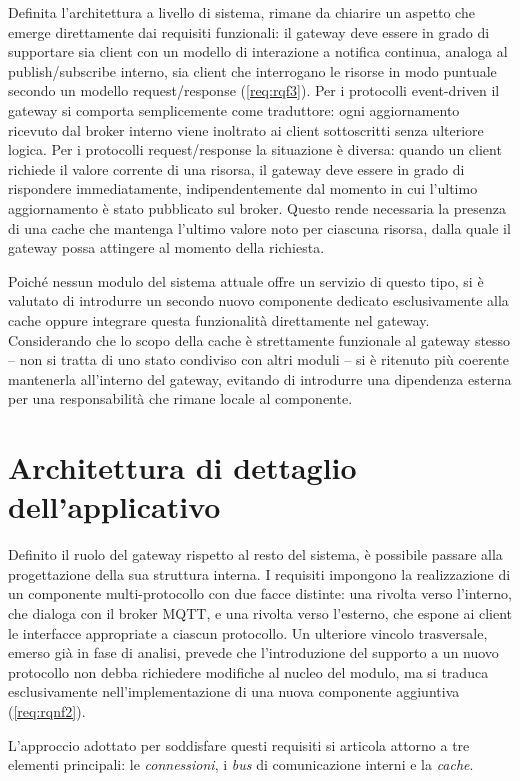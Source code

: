 Definita l'architettura a livello di sistema, rimane da chiarire un aspetto che emerge direttamente dai requisiti funzionali: il gateway deve essere in grado di supportare sia client con un modello di interazione a notifica continua, analoga al publish/subscribe interno, sia client che interrogano le risorse in modo puntuale secondo un modello request/response (\ref{req:rqf3}). Per i protocolli event-driven il gateway si comporta semplicemente come traduttore: ogni aggiornamento ricevuto dal broker interno viene inoltrato ai client sottoscritti senza ulteriore logica. Per i protocolli request/response la situazione è diversa: quando un client richiede il valore corrente di una risorsa, il gateway deve essere in grado di rispondere immediatamente, indipendentemente dal momento in cui l'ultimo aggiornamento è stato pubblicato sul broker. Questo rende necessaria la presenza di una cache che mantenga l'ultimo valore noto per ciascuna risorsa, dalla quale il gateway possa attingere al momento della richiesta.

Poiché nessun modulo del sistema attuale offre un servizio di questo tipo, si è valutato di  introdurre un secondo nuovo componente dedicato esclusivamente alla cache oppure integrare questa funzionalità direttamente nel gateway. Considerando che lo scopo della cache è strettamente funzionale al gateway stesso -- non si tratta di uno stato condiviso con altri moduli -- si è ritenuto più coerente mantenerla all'interno del gateway, evitando di introdurre una dipendenza esterna per una responsabilità che rimane locale al componente.
%
\section{Architettura di dettaglio dell'applicativo}
\label{sec:architetturale-di-dettaglio-applicativo}
%
Definito il ruolo del gateway rispetto al resto del sistema, è possibile passare alla progettazione della sua struttura interna. I requisiti impongono la realizzazione di un componente multi-protocollo con due facce distinte: una rivolta verso l'interno, che dialoga con il broker \ac{MQTT}, e una rivolta verso l'esterno, che espone ai client le interfacce appropriate a ciascun protocollo. Un ulteriore vincolo trasversale, emerso già in fase di analisi, prevede che l'introduzione del supporto a un nuovo protocollo non debba richiedere modifiche al nucleo del modulo, ma si traduca esclusivamente nell'implementazione di una nuova componente aggiuntiva (\ref{req:rqnf2}).

L'approccio adottato per soddisfare questi requisiti si articola attorno a tre elementi principali: le \textit{connessioni}, i \textit{bus} di comunicazione interni e la \textit{cache}.

